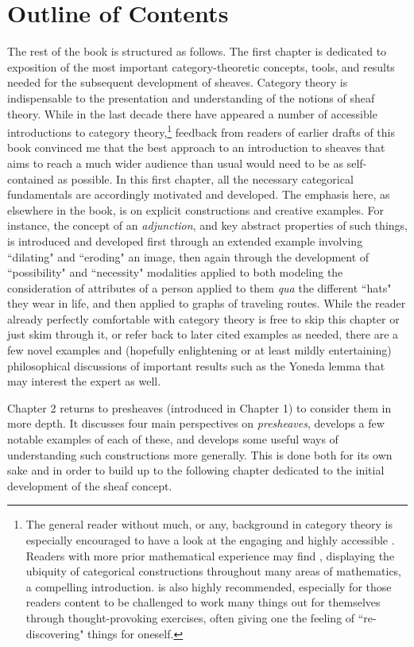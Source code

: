 \documentclass[11pt]{book}
\theoremstyle{definition}
\theoremstyle{definition}
\theoremstyle{definition}
\theoremstyle{theorem}
\theoremstyle{definition}
\begin{document}
	\section{Outline of Contents}   
	The rest of the book is structured as follows. The first chapter is dedicated to exposition of the most important category-theoretic concepts, tools, and results needed for the subsequent development of sheaves. Category theory is indispensable to the presentation and understanding of the notions of sheaf theory. While in the last decade there have appeared a number of accessible introductions to category theory,\footnote{The general reader without much, or any, background in category theory is especially encouraged to have a look at the engaging and highly accessible \cite{spivak_category_2014}. Readers with more prior mathematical experience may find \cite{riehl_category_2016}, displaying the ubiquity of categorical constructions throughout many areas of mathematics, a compelling introduction. \cite{lawvere_sets_2003} is also highly recommended, especially for those readers content to be challenged to work many things out for themselves through thought-provoking exercises, often giving one the feeling of ``re-discovering" things for oneself.} feedback from readers of earlier drafts of this book convinced me that the best approach to an introduction to sheaves that aims to reach a much wider audience than usual would need to be as self-contained as possible. In this first chapter, all the necessary categorical fundamentals are accordingly motivated and developed. The emphasis here, as elsewhere in the book, is on explicit constructions and creative examples. For instance, the concept of an \textit{adjunction}, and key abstract properties of such things, is introduced and developed first through an extended example involving ``dilating" and ``eroding" an image, then again through the development of ``possibility" and ``necessity" modalities applied to both modeling the consideration of attributes of a person applied to them \textit{qua} the different ``hats" they wear in life, and then applied to graphs of traveling routes. While the reader already perfectly comfortable with category theory is free to skip this chapter or just skim through it, or refer back to later cited examples as needed, there are a few novel examples and (hopefully enlightening or at least mildly entertaining) philosophical discussions of important results such as the Yoneda lemma that may interest the expert as well. \par 
	Chapter 2 returns to presheaves (introduced in Chapter 1) to consider them in more depth. It discusses four main perspectives on \textit{presheaves}, develops a few notable examples of each of these, and develops some useful ways of understanding such constructions more generally. This is done both for its own sake and in order to build up to the following chapter dedicated to the initial development of the sheaf concept.\par 
\end{document}
